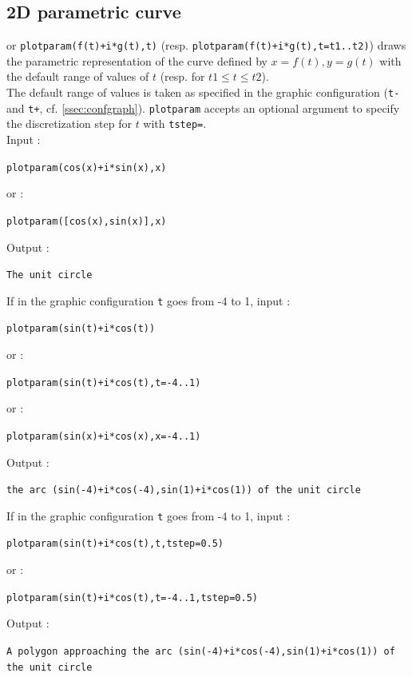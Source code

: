 \documentclass[a4paper,11pt]{book}
\begin{document}
\subsection{2D parametric curve }
or {\tt plotparam(f(t)+i*g(t),t)} (resp. 
{\tt plotparam(f(t)+i*g(t),t=t1..t2)})
draws the parametric representation of the curve 
defined by  $x=f(t),y=g(t)$ 
with the default range of values of $t$ (resp. for $t1 \leq t\leq t2$).\\
The default range of values is taken as specified 
in the graphic configuration ({\tt t-} and {\tt t+}, 
cf. \ref{ssec:confgraph}).
{\tt plotparam} accepts an optional argument to specify the discretization
step for $t$ with {\tt tstep=}.\\ 
Input :
\begin{center}{\tt plotparam(cos(x)+i*sin(x),x) }\end{center}
or :
\begin{center}{\tt plotparam([cos(x),sin(x)],x) }\end{center}
Output :
\begin{center}{\tt The unit circle}\end{center}
If in the graphic configuration {\tt t} goes from -4 to 1, input :
\begin{center}{\tt plotparam(sin(t)+i*cos(t))}\end{center}
or :
\begin{center}{\tt plotparam(sin(t)+i*cos(t),t=-4..1) }\end{center}
or :
\begin{center}{\tt plotparam(sin(x)+i*cos(x),x=-4..1) }\end{center}
Output :
\begin{center}{\tt the arc (sin(-4)+i*cos(-4),sin(1)+i*cos(1)) of the unit circle}\end{center}
If in the graphic configuration {\tt t} goes from -4 to 1, input :
\begin{center}{\tt plotparam(sin(t)+i*cos(t),t,tstep=0.5)}\end{center}
or :
\begin{center}{\tt plotparam(sin(t)+i*cos(t),t=-4..1,tstep=0.5)}\end{center}
Output :
\begin{center}{\tt A polygon approaching the arc (sin(-4)+i*cos(-4),sin(1)+i*cos(1)) of the unit circle}\end{center}
\end{document}
